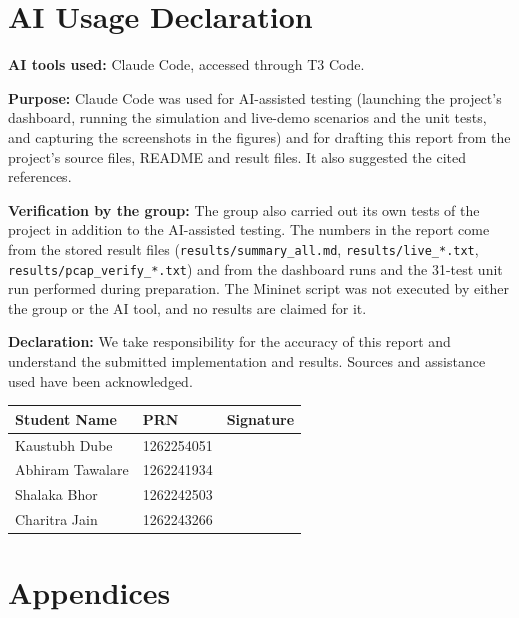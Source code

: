 \documentclass[12pt,a4paper]{article}
\newcommand{\code}[1]{\texttt{#1}}
\begin{document}
\section*{AI Usage Declaration}
\textbf{AI tools used:} Claude Code, accessed through T3 Code.

\textbf{Purpose:} Claude Code was used for AI-assisted testing (launching the project's dashboard,
running the simulation and live-demo scenarios and the unit tests, and capturing the screenshots in
the figures) and for drafting this report from the project's source files, README and result files.
It also suggested the cited references.

\textbf{Verification by the group:} The group also carried out its own tests of the project in
addition to the AI-assisted testing. The numbers in the report come from the stored result files
(\code{results/summary\_all.md}, \code{results/live\_*.txt}, \code{results/pcap\_verify\_*.txt}) and
from the dashboard runs and the 31-test unit run performed during preparation. The Mininet script
was not executed by either the group or the AI tool, and no results are claimed for it.

\medskip
\textbf{Declaration:} We take responsibility for the accuracy of this report and understand the
submitted implementation and results. Sources and assistance used have been acknowledged.

\begin{center}
\begin{tabular}{|l|l|l|}\hline
\textbf{Student Name} & \textbf{PRN} & \textbf{Signature}\\\hline
Kaustubh Dube & 1262254051 & \\\hline
Abhiram Tawalare & 1262241934 & \\\hline
Shalaka Bhor & 1262242503 & \\\hline
Charitra Jain & 1262243266 & \\\hline
\end{tabular}
\end{center}

\newpage
\section*{Appendices}
\end{document}
